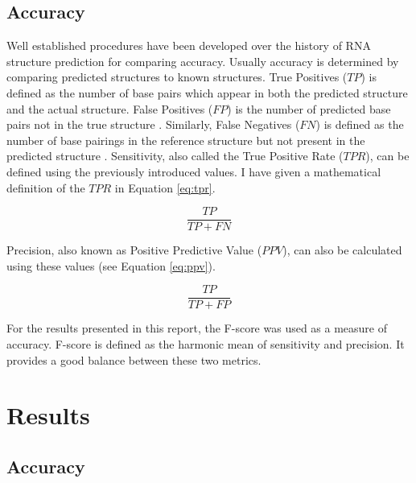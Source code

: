 \documentclass[12pt, a4paper]{article}
\begin{document}
\subsection{Accuracy}
Well established procedures have been developed over
the history of RNA structure prediction for comparing accuracy. Usually accuracy is determined by comparing predicted structures to known
structures. True Positives ($TP$) is defined as the number of base pairs which appear in both the predicted structure and the actual structure. False Positives
($FP$) is the number of predicted base pairs not in the true
structure \cite{lorenz2011viennarna}. Similarly, False Negatives ($FN$) is defined as the number of base
pairings in the reference structure but not present in the predicted structure \cite{lorenz2011viennarna}.
Sensitivity, also called the True Positive Rate ($TPR$), can be defined using the previously introduced values. I have given a mathematical definition of the $TPR$ in Equation \ref{eq:tpr}.

\begin{equation} \label{eq:tpr}
 \frac{TP}{TP + FN}
\end{equation}

Precision, also known as Positive Predictive Value ($PPV$), can also be calculated
using these values (see Equation \ref{eq:ppv}).


\begin{equation} \label{eq:ppv}
 \frac{TP}{TP + FP}
\end{equation}

For the results presented in this report, the F-score was used as a measure of accuracy. F-score is defined as the harmonic mean of sensitivity and precision. It provides a good balance between these two metrics.

\section{Results}
\label{sec:results}
\subsection{Accuracy}
\end{document}
